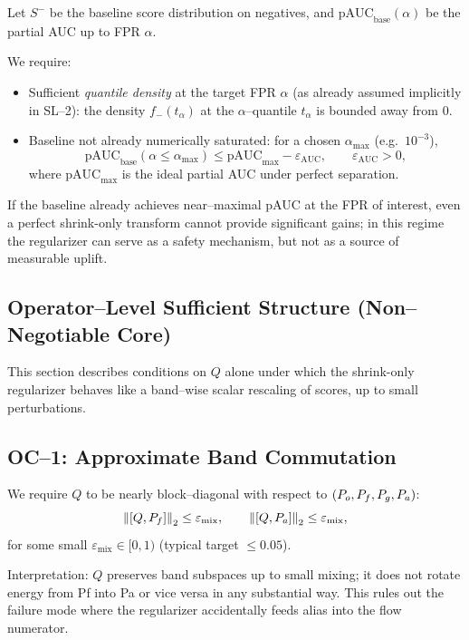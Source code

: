 Let $S^-$ be the baseline score distribution on negatives, and $\text{pAUC}_\text{base}(\alpha)$ be the partial AUC up to FPR $\alpha$.

We require:
\begin{itemize}[nosep]
  \item Sufficient \emph{quantile density} at the target FPR $\alpha$ (as already assumed implicitly in SL--2): the density $f_-(t_\alpha)$ at the $\alpha$--quantile $t_\alpha$ is bounded away from 0.
  \item Baseline not already numerically saturated: for a chosen $\alpha_{\max}$ (e.g.\ $10^{-3}$),
  \[
    \text{pAUC}_\text{base}(\alpha\le \alpha_{\max}) \le \text{pAUC}_{\max} - \varepsilon_{\text{AUC}},\qquad \varepsilon_{\text{AUC}}>0,
  \]
  where $\text{pAUC}_{\max}$ is the ideal partial AUC under perfect separation.
\end{itemize}

If the baseline already achieves near--maximal pAUC at the FPR of interest, even a perfect shrink-only transform cannot provide significant gains; in this regime the regularizer can serve as a safety mechanism, but not as a source of measurable uplift.

\subsection{Operator--Level Sufficient Structure (Non--Negotiable Core)}
\label{sec:operator}

This section describes conditions on $Q$ alone under which the shrink-only regularizer behaves like a band--wise scalar rescaling of scores, up to small perturbations.

\subsection{OC--1: Approximate Band Commutation}

We require $Q$ to be nearly block--diagonal with respect to $(P_o,P_f,P_g,P_a)$:
\[
\left\lVert [Q,P_f] \right\rVert_2 \le \varepsilon_{\text{mix}},\qquad
\left\lVert [Q,P_a] \right\rVert_2 \le \varepsilon_{\text{mix}},
\]
for some small $\varepsilon_{\text{mix}}\in[0,1)$ (typical target $\le 0.05$).

Interpretation: $Q$ preserves band subspaces up to small mixing; it does not rotate energy from Pf into Pa or vice versa in any substantial way. This rules out the failure mode where the regularizer accidentally feeds alias into the flow numerator.

